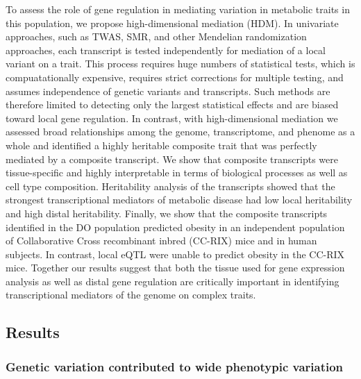 \documentclass[
]{article}
\begin{document}
To assess the role of gene regulation in mediating variation in
metabolic traits in this population, we propose high-dimensional
mediation (HDM). In univariate approaches, such as TWAS, SMR, and other
Mendelian randomization approaches, each transcript is tested
independently for mediation of a local variant on a trait. This process
requires huge numbers of statistical tests, which is compuatationally
expensive, requires strict corrections for multiple testing, and assumes
independence of genetic variants and transcripts. Such methods are
therefore limited to detecting only the largest statistical effects and
are biased toward local gene regulation. In contrast, with
high-dimensional mediation we assessed broad relationships among the
genome, transcriptome, and phenome as a whole and identified a highly
heritable composite trait that was perfectly mediated by a composite
transcript. We show that composite transcripts were tissue-specific and
highly interpretable in terms of biological processes as well as cell
type composition. Heritability analysis of the transcripts showed that
the strongest transcriptional mediators of metabolic disease had low
local heritability and high distal heritability. Finally, we show that
the composite transcripts identified in the DO population predicted
obesity in an independent population of Collaborative Cross recombinant
inbred (CC-RIX) mice and in human subjects. In contrast, local eQTL were
unable to predict obesity in the CC-RIX mice. Together our results
suggest that both the tissue used for gene expression analysis as well
as distal gene regulation are critically important in identifying
transcriptional mediators of the genome on complex traits.

\subsection{Results}\label{results}

\subsubsection{Genetic variation contributed to wide phenotypic
variation}\label{genetic-variation-contributed-to-wide-phenotypic-variation}
\end{document}
